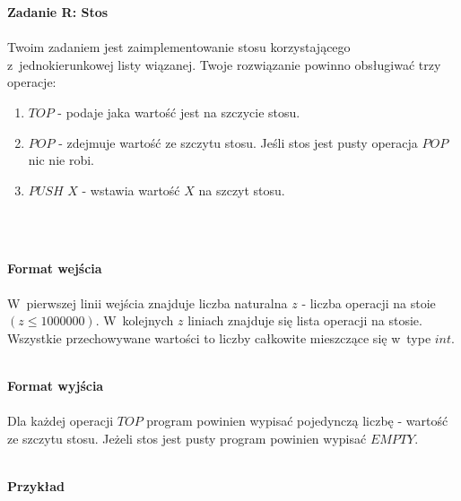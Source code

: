\documentclass[
  fontsize=12pt  %
 ,english        %
 ,headinclude    %
 ,headsepline    %
]{scrbook}       %
\begin{document}
\vspace{50 mm}
\hspace{50 mm}
\newline

\par{\Large \textbf{Zadanie R: Stos}} \\ \\
\indent Twoim zadaniem jest zaimplementowanie stosu korzystającego z~jednokierunkowej listy wiązanej. Twoje rozwiązanie powinno obsługiwać trzy operacje:
\begin{enumerate}
		\item $TOP$ - podaje jaka wartość jest na szczycie stosu.
		\item $POP$ - zdejmuje wartość ze szczytu stosu. Jeśli stos jest pusty operacja $POP$ nic nie robi.
		\item $PUSH$ $X$ - wstawia wartość $X$ na szczyt stosu.
\end{enumerate}
\\ \\
\par{\Large \textbf{Format wejścia}} \\ \\
\indent W~pierwszej linii wejścia znajduje liczba naturalna $z$ - liczba operacji na stoie $(z \leq 1000000)$. W~kolejnych $z$ liniach znajduje się lista operacji na stosie. Wszystkie przechowywane wartości to liczby całkowite mieszczące się w~type $int$.
\\ \\
\par{\Large \textbf{Format wyjścia}} \\ \\
\indent Dla każdej operacji $TOP$ program powinien wypisać pojedynczą liczbę - wartość ze szczytu stosu. Jeżeli stos jest pusty program powinien wypisać $EMPTY$.
\\ \\
\par{\Large \textbf{Przykład}} \\ \\
\end{document}
